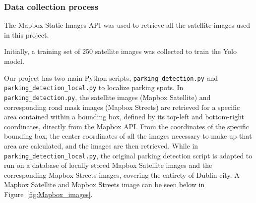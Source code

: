 \subsubsection{Data collection process}
The Mapbox Static Images API was used to retrieve all the satellite images used in this project.

Initially, a training set of 250 satellite images was collected to train the Yolo model.

Our project has two main Python scripts, \texttt{parking\_detection.py} and \texttt{parking\_detection\_local.py} to localize parking spots.
In \texttt{parking\_detection.py}, the satellite images (Mapbox Satellite) and corresponding road mask images (Mapbox Streets) are retrieved for a specific area contained within a bounding box, defined by its top-left and bottom-right coordinates, directly from the Mapbox API.
From the coordinates of the specific bounding box, the center coordinates of all the images necessary to make up that area are calculated, and the images are then retrieved.
While in \texttt{parking\_detection\_local.py}, the original parking detection script is adapted to run on a database of locally stored Mapbox Satellite images and the corresponding Mapbox Streets images, covering the entirety of Dublin city.
A Mapbox Satellite and Mapbox Streets image can be seen below in Figure~\ref{fig:Mapbox_images}.

